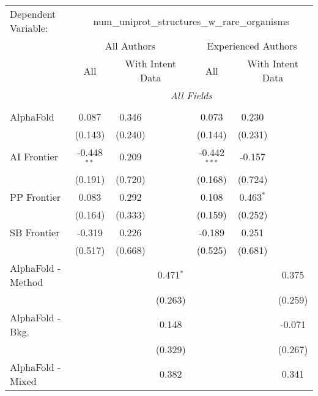 \begingroup
\centering
\begin{tabular}{lcccccc}
   \tabularnewline \midrule \midrule
   Dependent Variable: & \multicolumn{6}{c}{num\_uniprot\_structures\_w\_rare\_organisms}\\
 & \multicolumn{3}{c}{All Authors} & \multicolumn{3}{c}{Experienced Authors} \\
\cmidrule(lr){2-4} \cmidrule(lr){5-7}
 & \multicolumn{1}{c}{All} & \multicolumn{2}{c}{With Intent Data} & \multicolumn{1}{c}{All} & \multicolumn{2}{c}{With Intent Data} \\
\cmidrule(lr){2-2} \cmidrule(lr){3-4} \cmidrule(lr){5-5} \cmidrule(lr){6-7}
 & \multicolumn{6}{c}{\textit{All Fields}} \\ \\
   AlphaFold            & 0.087         & 0.346   &              & 0.073          & 0.230       &   \\   
                        & (0.143)       & (0.240) &              & (0.144)        & (0.231)     &   \\   
   AI Frontier          & -0.448$^{**}$ & 0.209   &              & -0.442$^{***}$ & -0.157      &   \\   
                        & (0.191)       & (0.720) &              & (0.168)        & (0.724)     &   \\   
   PP Frontier          & 0.083         & 0.292   &              & 0.108          & 0.463$^{*}$ &   \\   
                        & (0.164)       & (0.333) &              & (0.159)        & (0.252)     &   \\   
   SB Frontier          & -0.319        & 0.226   &              & -0.189         & 0.251       &   \\   
                        & (0.517)       & (0.668) &              & (0.525)        & (0.681)     &   \\   
   AlphaFold - Method   &               &         & 0.471$^{*}$  &                &             & 0.375\\   
                        &               &         & (0.263)      &                &             & (0.259)\\   
   AlphaFold - Bkg.     &               &         & 0.148        &                &             & -0.071\\   
                        &               &         & (0.329)      &                &             & (0.267)\\   
   AlphaFold - Mixed    &               &         & 0.382        &                &             & 0.341\\   

\end{tabular}
